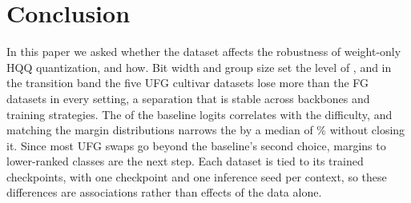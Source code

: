 \section{Conclusion}
\label{sec:conclusion}

In this paper we asked whether the dataset affects the robustness of weight-only HQQ quantization, and how.
Bit width and group size set the level of , and in the transition band the five UFG cultivar datasets lose more than the FG datasets in every setting, a separation that is stable across backbones and training strategies.
The  of the baseline logits correlates with the difficulty, and matching the margin distributions narrows the  by a median of \% without closing it.
Since most UFG swaps go beyond the baseline's second choice, margins to lower-ranked classes are the next step.
Each dataset is tied to its trained checkpoints, with one checkpoint and one inference seed per context, so these differences are associations rather than effects of the data alone.
